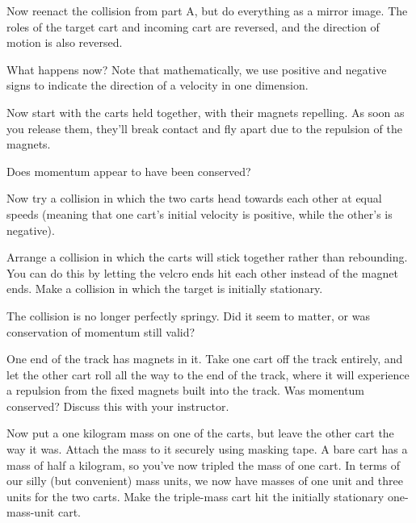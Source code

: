 Now reenact the collision from part A, but do everything as a mirror image. The roles of the target cart
 and incoming cart are reversed, and the direction of motion is also reversed.


What happens now? Note that mathematically, we use positive and negative signs to indicate the direction
 of a velocity in one dimension.

Now start with the carts held together, with their magnets repelling. As soon as you release them, they'll break
 contact and fly apart due to the repulsion of the magnets.


Does momentum appear to have been conserved?

Now try a collision in which the two carts head towards each other at equal speeds (meaning that one cart's
 initial velocity is positive, while the other's is negative).


Arrange a collision in which the carts will stick together rather than rebounding. You can do this by
 letting the velcro ends hit each other instead of the magnet ends. Make a collision in which the target
 is initially stationary.


The collision is no longer perfectly springy. Did it seem to matter, or was conservation of momentum still valid?

One end of the track has magnets in it. Take one cart off the track entirely, and let the other cart roll
 all the way to the end of the track, where it will experience a repulsion from the fixed magnets built into the
 track. Was momentum conserved? Discuss this with your instructor.

Now put a one kilogram mass on one of the carts, but leave the other cart the way it was. Attach the mass to
 it securely using masking tape. A bare cart has a mass of half a kilogram, so you've now tripled the mass of
 one cart. In terms of our silly (but convenient) mass units, we now have masses of one unit and three units for
 the two carts. Make the triple-mass cart hit the initially stationary one-mass-unit cart.


